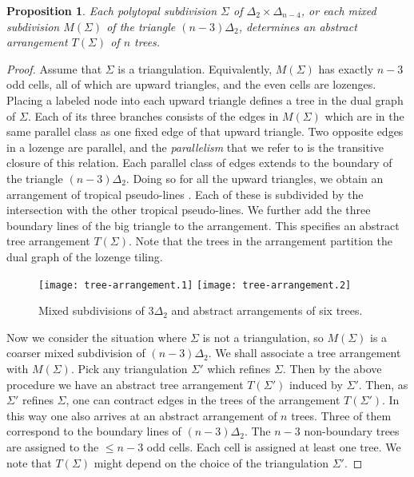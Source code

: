 \documentclass[12pt,a4paper]{amsart}
\newtheorem{prop}[thm]{Proposition}
\theoremstyle{definition}
\begin{document}
\begin{prop}\label{prop:KK}
  Each polytopal subdivision $\Sigma$ of
  $\Delta_{2}\times\Delta_{n-4}$, or each mixed subdivision
  $M(\Sigma)$ of the triangle $(n-3)\Delta_{2}$, determines an
  abstract arrangement $T(\Sigma)$ of $n$ trees.
\end{prop}

\begin{proof}
  Assume that $\Sigma$ is a triangulation.  Equivalently, $M(\Sigma)$
  has exactly $n-3$ odd cells, all of which are upward triangles, and
  the even cells are lozenges.  Placing a labeled node into each
  upward triangle defines a tree in the dual graph of $\Sigma$.  Each
  of its three branches consists of the edges in $M(\Sigma)$ which are
  in the same parallel class as one fixed edge of that upward
  triangle.  Two opposite edges in a lozenge are parallel, and the
  \emph{parallelism} that we refer to is the transitive closure of
  this relation.  Each parallel class of edges extends to the boundary
  of the triangle $(n-3)\Delta_2$.  Doing so for all the upward
  triangles, we obtain an arrangement of tropical pseudo-lines
  \cite{AD}.  Each of these is subdivided by the intersection with the
  other tropical pseudo-lines.  We further add the three boundary
  lines of the big triangle to the arrangement.  This specifies an
  abstract tree arrangement $T(\Sigma)$.  Note that the trees in the
  arrangement partition the dual graph of the lozenge tiling.

  \begin{figure}[ht]\centering
    \texttt{[image: tree-arrangement.1]}\qquad
    \texttt{[image: tree-arrangement.2]}
    \caption{Mixed subdivisions of $3\Delta_2$ and abstract
      arrangements of six trees.}
    \label{fig:lozenge}
  \end{figure}

  Now we consider the situation where $\Sigma$ is not a triangulation,
  so $M(\Sigma)$ is a coarser mixed subdivision of $(n-3)\Delta_2$.
  We shall associate a tree arrangement with $M(\Sigma)$.  Pick any
  triangulation $\Sigma'$ which refines $\Sigma$.  Then by the above
  procedure we have an abstract tree arrangement $T(\Sigma')$ induced
  by $\Sigma'$.  Then, as $\Sigma'$ refines $\Sigma$, one can contract
  edges in the trees of the arrangement $T(\Sigma')$.  In this way one
  also arrives at an abstract arrangement of $n$ trees.  Three of them
  correspond to the boundary lines of $(n-3)\Delta_2$.  The $n-3$
  non-boundary trees are assigned to the $ \leq n-3$ odd cells. Each
  cell is assigned at least one tree.  We note that $T(\Sigma)$ might
  depend on the choice of the triangulation $\Sigma'$.
\end{proof}
\end{document}

